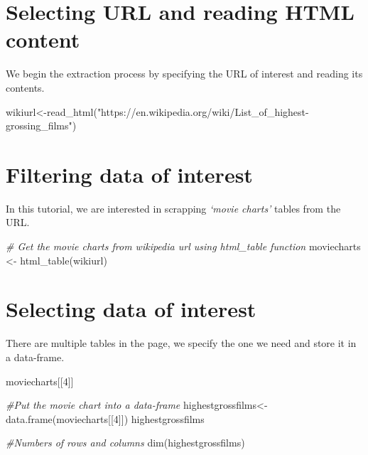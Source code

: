 \documentclass[
]{article}
\newenvironment{Shaded}{\begin{snugshade}}{\end{snugshade}}
\newcommand{\CommentTok}[1]{\textcolor[rgb]{0.56,0.35,0.01}{\textit{#1}}}
\newcommand{\DecValTok}[1]{\textcolor[rgb]{0.00,0.00,0.81}{#1}}
\newcommand{\FunctionTok}[1]{\textcolor[rgb]{0.00,0.00,0.00}{#1}}
\newcommand{\NormalTok}[1]{#1}
\newcommand{\OtherTok}[1]{\textcolor[rgb]{0.56,0.35,0.01}{#1}}
\newcommand{\StringTok}[1]{\textcolor[rgb]{0.31,0.60,0.02}{#1}}
\begin{document}
\hypertarget{selecting-url-and-reading-html-content}{%
\section{Selecting URL and reading HTML
content}\label{selecting-url-and-reading-html-content}}

We begin the extraction process by specifying the URL of interest and
reading its contents.

\begin{Shaded}
\begin{Highlighting}[]
\NormalTok{wikiurl}\OtherTok{\textless{}{-}}\FunctionTok{read\_html}\NormalTok{(}\StringTok{"https://en.wikipedia.org/wiki/List\_of\_highest{-}grossing\_films"}\NormalTok{)}
\end{Highlighting}
\end{Shaded}

\hypertarget{filtering-data-of-interest}{%
\section{Filtering data of interest}\label{filtering-data-of-interest}}

In this tutorial, we are interested in scrapping \emph{`movie charts'}
tables from the URL.

\begin{Shaded}
\begin{Highlighting}[]
\CommentTok{\# Get the movie charts from wikipedia url using html\_table function}
\NormalTok{moviecharts }\OtherTok{\textless{}{-}} \FunctionTok{html\_table}\NormalTok{(wikiurl)}
\end{Highlighting}
\end{Shaded}

\hypertarget{selecting-data-of-interest}{%
\section{Selecting data of interest}\label{selecting-data-of-interest}}

There are multiple tables in the page, we specify the one we need and
store it in a data-frame.

\begin{Shaded}
\begin{Highlighting}[]
\NormalTok{moviecharts[[}\DecValTok{4}\NormalTok{]]}


\CommentTok{\#Put the movie chart into a data{-}frame}
\NormalTok{highestgrossfilms}\OtherTok{\textless{}{-}}\FunctionTok{data.frame}\NormalTok{(moviecharts[[}\DecValTok{4}\NormalTok{]])}
\NormalTok{highestgrossfilms}

\CommentTok{\#Numbers of rows and columns}
\FunctionTok{dim}\NormalTok{(highestgrossfilms)}
\end{Highlighting}
\end{Shaded}
\end{document}
